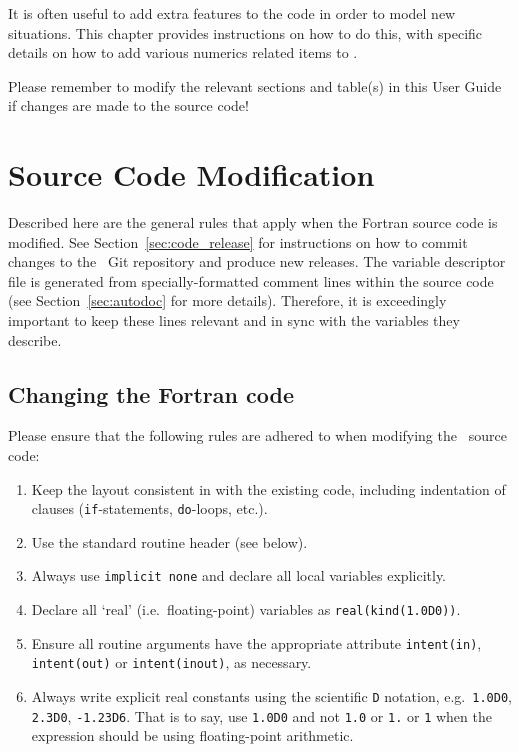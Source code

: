 \label{chap:modify}

It is often useful to add extra features to the code in order to model new
situations. This chapter provides instructions on how to do this, with
specific details on how to add various numerics related items to \process.

Please remember to modify the relevant sections and table(s) in this User
Guide if changes are made to the source code!

\section{Source Code Modification}
\label{sec:codemods}

Described here are the general rules that apply when the Fortran source code
is modified. See Section~\ref{sec:code_release} for instructions on how to
commit changes to the \process\ Git repository and produce new releases. The variable descriptor file is generated from specially-formatted comment lines within the source code (see Section~\ref{sec:autodoc} for more details). Therefore, it is exceedingly important to keep these lines relevant and in sync with the variables they describe.

\subsection{Changing the Fortran code}

Please ensure that the following rules are adhered to when modifying the
\process\ source code:

\begin{enumerate}

\item Keep the layout consistent in with the existing code,
  including indentation of clauses (\texttt{if}-statements, \texttt{do}-loops,
  etc.).

\item Use the standard routine header (see below).

\item Always use \verb+implicit none+ and declare all local variables
  explicitly.

\item Declare all `real' (i.e.\ floating-point) variables as
  \texttt{real(kind(1.0D0))}.

\item Ensure all routine arguments have the appropriate attribute \texttt{intent(in)},
  \texttt{intent(out)} or \texttt{intent(inout)}, as necessary.

\item Always write explicit real constants using the scientific \texttt{D}
  notation, e.g.\ \texttt{1.0D0}, \texttt{2.3D0}, \texttt{-1.23D6}. That is to
  say, use \texttt{1.0D0} and not \texttt{1.0} or \texttt{1.} or \texttt{1} when the
  expression should be using floating-point arithmetic.

\end{enumerate}

